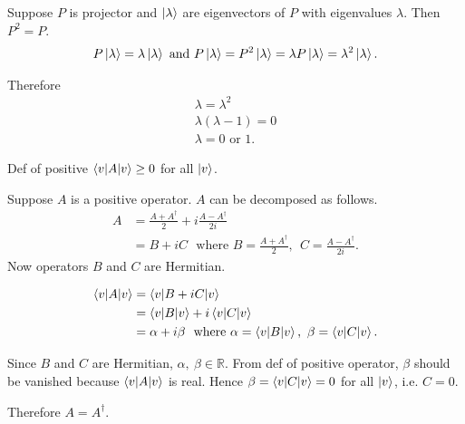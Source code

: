 
Suppose $P$ is projector and $\ket{\lambda}$  are eigenvectors of $P$ with eigenvalues $\lambda$.
Then $P^2 = P$.
\begin{align*}
	P \ket{\lambda} = \lambda \ket{\lambda} \text{ and }	P \ket{\lambda} = P^2 \ket{\lambda} = \lambda  P \ket{\lambda} = \lambda^2 \ket{\lambda}.
\end{align*}

Therefore
\begin{align*}
	\lambda = \lambda^2\\
	\lambda (\lambda - 1) = 0\\
	\lambda = 0 \text{ or } 1.
\end{align*}



Def of positive $\braket{v | A | v} \geq 0$ for all $\ket{v}$.

Suppose $A$ is a positive operator. $A$ can be decomposed as follows.
\begin{align*}
	A &= \frac{A + A^\dagger}{2} + i \frac{A - A^\dagger}{2i}\\
		&= B + i C  ~~~\text{where } B =\frac{A + A^\dagger}{2}, ~~  C = \frac{A - A^\dagger}{2i}.
\end{align*}
Now operators $B$ and $C$ are Hermitian.

\begin{align*}
	\braket{v | A | v}  &= \braket{v | B + iC | v}\\
		&= \braket{v | B | v}  + i \braket{v | C | v}\\
		&= \alpha + i \beta ~~ \text{where } \alpha = \braket{v | B | v}, ~\beta = \braket{v | C | v}.
\end{align*}

Since $B$ and $C$ are Hermitian, $\alpha,~ \beta \in \mathds{R}$.
From def of positive operator, $\beta$ should be vanished because $\braket{v | A | v}$ is real.
Hence $\beta = \braket{v | C | v} =  0$ for all $\ket{v}$, i.e. $C = 0$.

Therefore $A = A^\dagger$.


